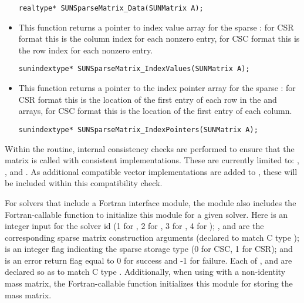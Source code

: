 \begin{itemize}
  \verb|realtype* SUNSparseMatrix_Data(SUNMatrix A);|


\item {}

  This function returns a pointer to index value array for the sparse
  : for CSR format this is the column index for each nonzero
  entry, for CSC format this is the row index for each nonzero entry.
 
  \verb|sunindextype* SUNSparseMatrix_IndexValues(SUNMatrix A);|


\item {}

  This function returns a pointer to the index pointer array for the
  sparse : for CSR format this is the location of the first
  entry of each row in the  and  arrays, for
  CSC format this is the location of the first entry of each column.
 
  \verb|sunindextype* SUNSparseMatrix_IndexPointers(SUNMatrix A);|

\end{itemize}
{\warn} Within the  routine, internal
consistency checks are performed to ensure that the matrix is called
with consistent {\nvector} implementations.  These are currently
limited to: {\nvecs}, {\nvecopenmp}, and {\nvecpthreads}.  As
additional compatible vector implementations are added to {\sundials},
these will be included within this compatibility check. 


For solvers that include a Fortran interface module, the {\sunmatsparse}
module also includes the Fortran-callable
function  to
initialize this {\sunmatsparse} module for a given {\sundials} solver.
Here  is an integer input for the solver id (1 for {\cvode},
2 for {\ida}, 3 for {\kinsol}, 4 for {\arkode}); , 
and  are the corresponding sparse matrix construction
arguments (declared to match C type );  is an integer flag indicating the sparse
storage type (0 for CSC, 1 for CSR); and  is an error return
flag equal to 0 for success and -1 for failure. Each of ,
 and  are declared so as to match C
type . Additionally, when using {\arkode} with a non-identity
mass matrix, the Fortran-callable
function  
initializes this {\sunmatsparse} module for storing the mass matrix.
